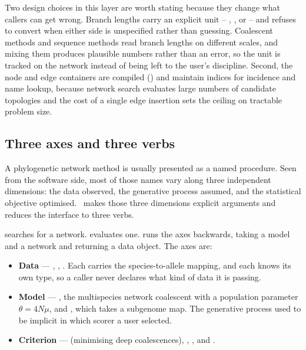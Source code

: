 Two design choices in this layer are worth stating because they change what
callers can get wrong. Branch lengths carry an explicit unit --
, , or
 -- and  refuses to
convert when either side is unspecified rather than guessing. Coalescent
methods and sequence methods read branch lengths on different scales, and
mixing them produces plausible numbers rather than an error, so the unit is
tracked on the network instead of being left to the user's discipline. Second,
the node and edge containers are compiled () and maintain
indices for incidence and name lookup, because network search evaluates large
numbers of candidate topologies and the cost of a single edge insertion sets
the ceiling on tractable problem size.

\subsection{Three axes and three verbs}

A phylogenetic network method is usually presented as a named procedure. Seen
from the software side, most of those names vary along three independent
dimensions: the data observed, the generative process assumed, and the
statistical objective optimised. \phynetpy\ makes those three dimensions
explicit arguments and reduces the interface to three verbs.

 searches for a network.  evaluates one. 
runs the axes backwards, taking a model and a network and returning a data
object. The axes are:

\begin{itemize}
  \item \textbf{Data} --- , ,
    . Each carries the species-to-allele mapping, and
    each knows its own type, so a caller never declares what kind of data it
    is passing.
  \item \textbf{Model} --- , the multispecies network coalescent with
    a population parameter $\theta = 4N\mu$, and , which
    takes a subgenome map. The generative process used to be implicit in which
    scorer a user selected.
  \item \textbf{Criterion} ---  (minimising deep coalescences),
    , , and .
\end{itemize}

